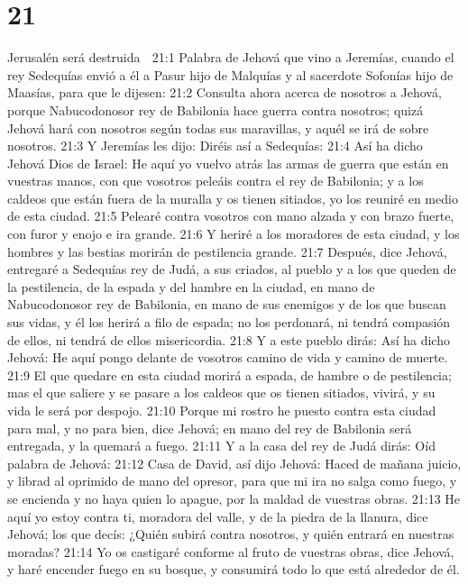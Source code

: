 \chapter{21}

Jerusalén será destruida  

21:1 Palabra de Jehová que vino a Jeremías, cuando el rey Sedequías envió a él a Pasur hijo de Malquías y al sacerdote Sofonías hijo de Maasías, para que le dijesen:  
21:2 Consulta ahora acerca de nosotros a Jehová, porque Nabucodonosor rey de Babilonia hace guerra contra nosotros; quizá Jehová hará con nosotros según todas sus maravillas, y aquél se irá de sobre nosotros.  
21:3 Y Jeremías les dijo: Diréis así a Sedequías:  
21:4 Así ha dicho Jehová Dios de Israel: He aquí yo vuelvo atrás las armas de guerra que están en vuestras manos, con que vosotros peleáis contra el rey de Babilonia; y a los caldeos que están fuera de la muralla y os tienen sitiados, yo los reuniré en medio de esta ciudad.  
21:5 Pelearé contra vosotros con mano alzada y con brazo fuerte, con furor y enojo e ira grande.  
21:6 Y heriré a los moradores de esta ciudad, y los hombres y las bestias morirán de pestilencia grande.  
21:7 Después, dice Jehová, entregaré a Sedequías rey de Judá, a sus criados, al pueblo y a los que queden de la pestilencia, de la espada y del hambre en la ciudad, en mano de Nabucodonosor rey de Babilonia, en mano de sus enemigos y de los que buscan sus vidas, y él los herirá a filo de espada; no los perdonará, ni tendrá compasión de ellos, ni tendrá de ellos misericordia.  
21:8 Y a este pueblo dirás: Así ha dicho Jehová: He aquí pongo delante de vosotros camino de vida y camino de muerte.  
21:9 El que quedare en esta ciudad morirá a espada, de hambre o de pestilencia; mas el que saliere y se pasare a los caldeos que os tienen sitiados, vivirá, y su vida le será por despojo.  
21:10 Porque mi rostro he puesto contra esta ciudad para mal, y no para bien, dice Jehová; en mano del rey de Babilonia será entregada, y la quemará a fuego.  
21:11 Y a la casa del rey de Judá dirás: Oíd palabra de Jehová:  
21:12 Casa de David, así dijo Jehová: Haced de mañana juicio, y librad al oprimido de mano del opresor, para que mi ira no salga como fuego, y se encienda y no haya quien lo apague, por la maldad de vuestras obras.  
21:13 He aquí yo estoy contra ti, moradora del valle, y de la piedra de la llanura, dice Jehová; los que decís: ¿Quién subirá contra nosotros, y quién entrará en nuestras moradas?  
21:14 Yo os castigaré conforme al fruto de vuestras obras, dice Jehová, y haré encender fuego en su bosque, y consumirá todo lo que está alrededor de él.  

